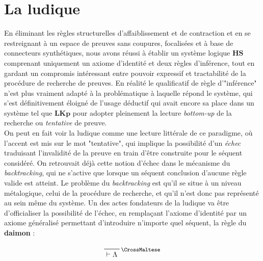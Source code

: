 \documentclass[12pt]{report}
\newcommand{\dai}{\text{\CrossMaltese}}
\newcommand{\seq}{\vdash}
\newcommand{\irule}[1]{\footnotesize$#1$}
\begin{document}
\chapter*{La ludique}

En éliminant les règles structurelles d'affaiblissement et de contraction et en se restreignant à un espace de preuves sans coupures, focalisées et à base de connecteurs synthétiques, nous avons réussi à établir un système logique $\mathbf{HS}$ comprenant uniquement un axiome d'identité et deux règles d'inférence, tout en gardant un compromis intéressant entre pouvoir expressif et tractabilité de la procédure de recherche de preuves. En réalité le qualificatif de règle d'"inférence" n'est plus vraiment adapté à la problématique à laquelle répond le système, qui s'est définitivement éloigné de l'usage déductif qui avait encore sa place dans un système tel que $\mathbf{LKp}$ pour adopter pleinement la lecture \textit{bottom-up} de la recherche ou \emph{tentative} de preuve.\\

On peut en fait voir la ludique comme une lecture littérale de ce paradigme, où l'accent est mis sur le mot "tentative", qui implique la possibilité d'un \emph{échec} traduisant l'invalidité de la preuve en train d'être construite pour le séquent considéré. On retrouvait déjà cette notion d'échec dans le mécanisme du \textit{backtracking}, qui ne s'active que lorsque un séquent conclusion d'aucune règle valide est atteint. Le problème du \textit{backtracking} est qu'il se situe à un niveau métalogique, celui de la procédure de recherche, et qu'il n'est donc pas représenté au sein même du système. Un des actes fondateurs de la ludique va être d'officialiser la possibilité de l'échec, en remplaçant l'axiome d'identité par un axiome généralisé permettant d'introduire n'importe quel séquent, la règle du \textbf{daimon} :

\begin{displaymath}
	\prftree[r]{\irule{\dai}}
		{\seq \Lambda}
\end{displaymath}
\end{document}
